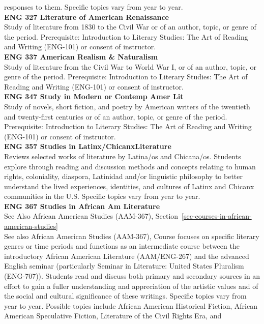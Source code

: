 \documentclass[
  letterpaper,
]{scrbook}
\begin{document}
responses to them. Specific topics vary from year to year.\\
\textbf{ENG 327 Literature of American Renaissance}\\
Study of literature from 1830 to the Civil War or of an author, topic,
or genre of the period. Prerequisite: Introduction to Literary Studies:
The Art of Reading and Writing (ENG-101) or consent of instructor.\\
\textbf{ENG 337 American Realism \& Naturalism}\\
Study of literature from the Civil War to World War I, or of an author,
topic, or genre of the period. Prerequisite: Introduction to Literary
Studies: The Art of Reading and Writing (ENG-101) or consent of
instructor.\\
\textbf{ENG 347 Study in Modern or Contemp Amer Lit}\\
Study of novels, short fiction, and poetry by American writers of the
twentieth and twenty-first centuries or of an author, topic, or genre of
the period. Prerequisite: Introduction to Literary Studies: The Art of
Reading and Writing (ENG-101) or consent of instructor.\\
\textbf{ENG 357 Studies in Latinx/ChicanxLiterature}\\
Reviews selected works of literature by Latina/os and Chicana/os.
Students explore through reading and discussion methods and concepts
relating to human rights, coloniality, diaspora, Latinidad and/or
linguistic philosophy to better understand the lived experiences,
identities, and cultures of Latinx and Chicanx communities in the U.S.
Specific topics vary from year to year.\\
\textbf{ENG 367 Studies in African Am Literature}\\
See Also African American Studies (AAM-367),
Section~\ref{sec-courses-in-african-american-studies}\\
See also African American Studies (AAM-367), Course focuses on specific
literary genres or time periods and functions as an intermediate course
between the introductory African American Literature (AAM/ENG-267) and
the advanced English seminar (particularly Seminar in Literature: United
States Pluralism (ENG-707)). Students read and discuss both primary and
secondary sources in an effort to gain a fuller understanding and
appreciation of the artistic values and of the social and cultural
significance of these writings. Specific topics vary from year to year.
Possible topics include African American Historical Fiction, African
American Speculative Fiction, Literature of the Civil Rights Era, and
\end{document}

